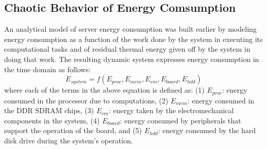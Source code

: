 \documentclass[times, 10pt,twocolumn]{IEEEtran}
\begin{document}
\subsection{Chaotic Behavior of Energy Comsumption}
\label{sec:chaot-pred-energy}
An analytical model of server energy consumption was built earlier
\cite{Lewis2008,Lewis2010} by modeling energy consumption as a
function of the work done by the system in executing its computational
tasks and of residual thermal energy given off by the system in doing
that work.  The resulting dynamic system expresses energy consumption in
the time domain as follows:
\begin{equation}
  \label{eq:system}
  E_{system}=f(E_{proc},E_{mem},E_{em},E_{board},E_{hdd})
\end{equation}
where each of the terms in the above equation is defined as: (1)
$E_{proc}$: energy consumed in the processor due to computations, (2)
$E_{mem}$: energy consumed in the DDR SDRAM chips, (3) $E_{em}$: energy taken by the
electromechanical components in the system, (4) $E_{board}$:
energy consumed by peripherals that support the operation of the board,
and (5) $E_{hdd}$: energy consumed by the hard disk drive during the
system's operation.
\end{document}
